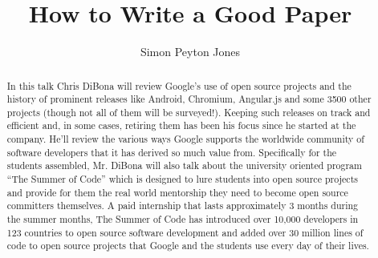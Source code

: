 \documentclass[a4paper,UKenglish]{oasics-v2016}
\title{How to Write a Good Paper}
\author{Simon Peyton Jones}
\affil{Microsoft Research Cambridge}
\begin{document}
\maketitle
\begin{abstract}
In this talk Chris DiBona will review Google’s use of open source projects and the history of prominent releases like Android, Chromium, Angular.js and some 3500 other projects (though not all of them will be surveyed!). 
Keeping such releases on track and efficient and, in some cases, retiring them has been his focus since he started at the company.
He’ll review the various ways Google supports the worldwide community of software developers that it has derived so much value from. 
Specifically for the students assembled, Mr. DiBona will also talk about the university oriented program “The Summer of Code” which is designed 
to lure students into open source projects and provide for them the real world mentorship they need to become open source committers themselves. 
A paid internship that lasts approximately 3 months during the summer months, The Summer of Code has introduced over 10,000 developers in 123
countries to open source software development and added over 30 million lines of code to open source 
projects that Google and the students use every day of their lives.
\end{abstract}
\end{document}
